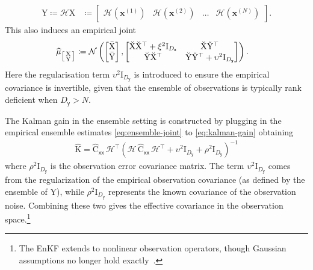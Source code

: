 \documentclass[wcp]{jmlr} %
\newcommand{\vv}[1]{\boldsymbol{#1}}
\newcommand{\mm}[1]{\mathrm{#1}}
\newcommand{\mmmean}[1]{\bar{\mathrm{#1}}}
\newcommand{\mmdev}[1]{\breve{\mathrm{#1}}}
\newcommand{\rv}[1]{\mathsf{#1}}
\newcommand{\vrv}[1]{\vv{\rv{#1}}}
\newcommand{\op}[1]{\mathcal{#1}}
\newcommand{\Normal}{\mathcal{N}}
\begin{document}
\begin{align}
    \mm{Y}\coloneq\op{H}\mm{X} &\coloneq \begin{bmatrix}\op{H}(\vv{x}^{(1)}) & \op{H}(\vv{x}^{(2)})& \dots& \op{H}(\vv{x}^{(N)})\end{bmatrix}.
\end{align}
This also induces an empirical joint
\begin{align}
    \ELaw[{\left[\begin{smallmatrix}
        \mm{X}\\
        \mm{Y}
    \end{smallmatrix}\right]}] &\coloneq \Normal\left(\begin{bmatrix}
        \mmmean{X}\\
        \mmmean{Y}
    \end{bmatrix},
    \begin{bmatrix}
        \mmdev{X} \mmdev{X}^\top + \xi^2\mm{I}_{D_{\vrv{x}}} & \mmdev{X} \mmdev{Y}^\top \\
        \mmdev{Y} \mmdev{X}^\top  & \mmdev{Y} \mmdev{Y}^\top + \upsilon^2\mm{I}_{D_{\vrv{y}}}
    \end{bmatrix}
    \right).\label{eq:ensemble-joint}
\end{align}
Here the regularisation term \(\upsilon^2\mm{I}_{D_{\vrv{y}}}\) is introduced to ensure the empirical covariance is invertible, given that the ensemble of observations is typically rank deficient when \(D_{\vrv{y}}>N\).

The Kalman gain in the ensemble setting is constructed by plugging in the empirical ensemble estimates \eqref{eq:ensemble-joint} to \eqref{eq:kalman-gain} obtaining
\begin{align}
\widehat{\mm{K}}= \widehat{\mm{C}}_{\vrv{xx}}\, \op{H}^\top \left(\op{H}\,\widehat{\mm{C}}_{\vrv{xx}}\,\op{H}^\top + \upsilon^2\mm{I}_{D_{\vrv{y}}} + \rho^2\mm{I}_{D_{\vrv{y}}}\right)^{-1}\label{eq:ensemble-kalman-gain}
\end{align}
where \(\rho^2\mm{I}_{D_{\vrv{y}}}\) is the observation error covariance matrix.
The term
\(\upsilon^2\mm{I}_{D_{\vrv{y}}}\) comes from the regularization of the empirical observation covariance (as defined by the ensemble of
\(\mm{Y}\)), while \(\rho^2\mm{I}_{D_{\vrv{y}}}\) represents the known covariance of the observation noise.
Combining these two gives the effective covariance in the observation space.\footnote{The EnKF extends to nonlinear observation operators, though Gaussian assumptions no longer hold exactly~\citep{Evensen2009Data}.}
\end{document}
